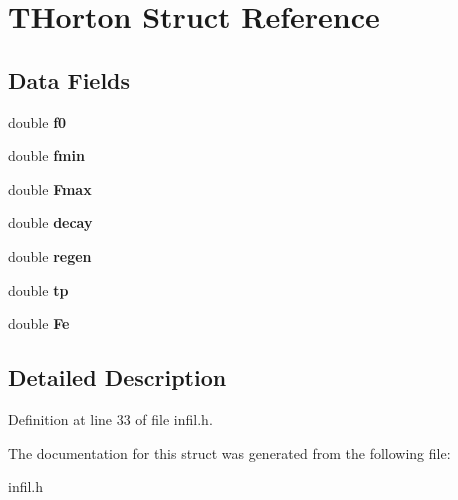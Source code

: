 \hypertarget{struct_t_horton}{}\section{T\+Horton Struct Reference}
\label{struct_t_horton}
\subsection*{Data Fields}
\begin{DoxyCompactItemize}
\item 
\mbox{\label{struct_t_horton_a21dc9c125e26e5af3ff2e487cf27cdcd}} 
double {\bfseries f0}
\item 
\mbox{\label{struct_t_horton_af8ba8cd1787b3f8bb2f14fe0790a677f}} 
double {\bfseries fmin}
\item 
\mbox{\label{struct_t_horton_a86b11e94ff3fc0c3b2975f89bded7f92}} 
double {\bfseries Fmax}
\item 
\mbox{\label{struct_t_horton_ab01a33c3f845cc963c97a17973b4e871}} 
double {\bfseries decay}
\item 
\mbox{\label{struct_t_horton_ad827b247bd930ce94ec7495415c7943c}} 
double {\bfseries regen}
\item 
\mbox{\label{struct_t_horton_a27645445b4ea6d3bccd1ab6359ec5d6c}} 
double {\bfseries tp}
\item 
\mbox{\label{struct_t_horton_a96f1a393d376b3af7a4184227edd0025}} 
double {\bfseries Fe}
\end{DoxyCompactItemize}


\subsection{Detailed Description}


Definition at line 33 of file infil.\+h.



The documentation for this struct was generated from the following file\+:\begin{DoxyCompactItemize}
\item 
infil.\+h\end{DoxyCompactItemize}
